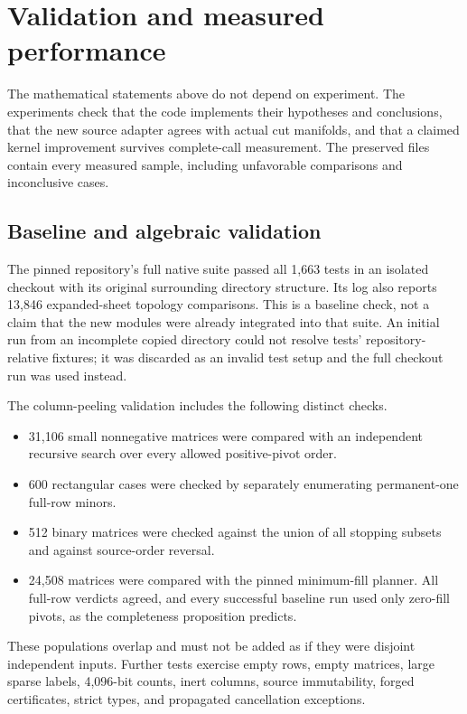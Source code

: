 \section{Validation and measured performance}
\label{sec:experiments}

The mathematical statements above do not depend on experiment.  The
experiments check that the code implements their hypotheses and conclusions,
that the new source adapter agrees with actual cut manifolds, and that a
claimed kernel improvement survives complete-call measurement.  The
preserved files contain every measured sample, including unfavorable
comparisons and inconclusive cases.

\subsection{Baseline and algebraic validation}

The pinned repository's full native suite passed all 1,663 tests in an
isolated checkout with its original surrounding directory structure.  Its
log also reports 13,846 expanded-sheet topology comparisons.  This is a
baseline check, not a claim that the new modules were already integrated
into that suite.  An initial run from an incomplete copied directory could
not resolve tests' repository-relative fixtures; it was discarded as an
invalid test setup and the full checkout run was used instead.

The column-peeling validation includes the following distinct checks.
\begin{itemize}
\item 31,106 small nonnegative matrices were compared with an independent
recursive search over every allowed positive-pivot order.
\item 600 rectangular cases were checked by separately enumerating
permanent-one full-row minors.
\item 512 binary matrices were checked against the union of all stopping
subsets and against source-order reversal.
\item 24,508 matrices were compared with the pinned minimum-fill planner.
All full-row verdicts agreed, and every successful baseline run used only
zero-fill pivots, as the completeness proposition predicts.
\end{itemize}
These populations overlap and must not be added as if they were disjoint
independent inputs.  Further tests exercise empty rows, empty matrices,
large sparse labels, 4,096-bit counts, inert columns, source immutability,
forged certificates, strict types, and propagated cancellation exceptions.

